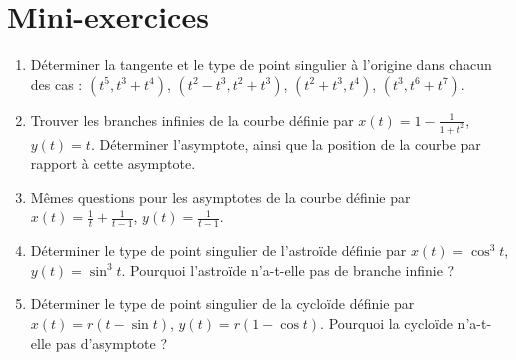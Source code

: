 \begin{frame}



	
\end{frame}



\section{Mini-exercices}

\begin{frame}
\begin{miniexercice}
\begin{enumerate}
  \item Déterminer la tangente et le type de point singulier à l'origine 
  dans chacun des cas :
  $(t^5,t^3+t^4)$, $(t^2-t^3,t^2+t^3)$, $(t^2+t^3,t^4)$, $(t^3,t^6+t^7)$.
 
  \item Trouver les branches infinies de la courbe définie par 
  $x(t) = 1-\frac{1}{1+t^2}$, $y(t)=t$. Déterminer l'asymptote, ainsi que la position
  de la courbe par rapport à cette asymptote.
  
  \item Mêmes questions pour les asymptotes de la courbe définie par 
  $x(t) = \frac{1}{t}+\frac{1}{t-1}$, $y(t)=\frac{1}{t-1}$.
  
  \item Déterminer le type de point singulier de l'astroïde définie par $x(t) = \cos^3 t$,
  $y(t) = \sin^3 t$. Pourquoi l'astroïde n'a-t-elle pas de branche infinie ?
  
  \item Déterminer le type de point singulier de la cycloïde définie par 
  $x(t) = r(t-\sin t)$,  $y(t) = r(1-\cos t)$. Pourquoi la cycloïde
  n'a-t-elle pas d'asymptote ?
\end{enumerate}
\end{miniexercice}
\end{frame}


